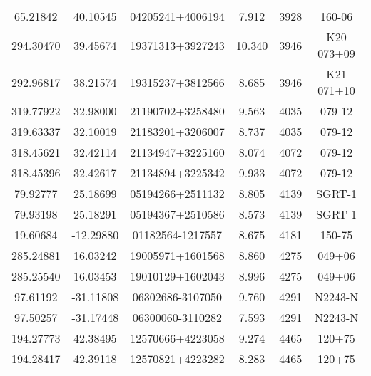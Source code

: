 \begin{longtable}{cccccc}
65.21842 & 40.10545 & 04205241+4006194 & 7.912 & 3928 & 160-06 \\
294.30470 & 39.45674 & 19371313+3927243 & 10.340 & 3946 & K20 073+09 \\
292.96817 & 38.21574 & 19315237+3812566 & 8.685 & 3946 & K21 071+10 \\
319.77922 & 32.98000 & 21190702+3258480 & 9.563 & 4035 & 079-12 \\
319.63337 & 32.10019 & 21183201+3206007 & 8.737 & 4035 & 079-12 \\
318.45621 & 32.42114 & 21134947+3225160 & 8.074 & 4072 & 079-12 \\
318.45396 & 32.42617 & 21134894+3225342 & 9.933 & 4072 & 079-12 \\
79.92777 & 25.18699 & 05194266+2511132 & 8.805 & 4139 & SGRT-1 \\
79.93198 & 25.18291 & 05194367+2510586 & 8.573 & 4139 & SGRT-1 \\
19.60684 & -12.29880 & 01182564-1217557 & 8.675 & 4181 & 150-75 \\
285.24881 & 16.03242 & 19005971+1601568 & 8.860 & 4275 & 049+06 \\
285.25540 & 16.03453 & 19010129+1602043 & 8.996 & 4275 & 049+06 \\
97.61192 & -31.11808 & 06302686-3107050 & 9.760 & 4291 & N2243-N \\
97.50257 & -31.17448 & 06300060-3110282 & 7.593 & 4291 & N2243-N \\
194.27773 & 42.38495 & 12570666+4223058 & 9.274 & 4465 & 120+75 \\
194.28417 & 42.39118 & 12570821+4223282 & 8.283 & 4465 & 120+75 \\
\hline\hline
\end{longtable}
